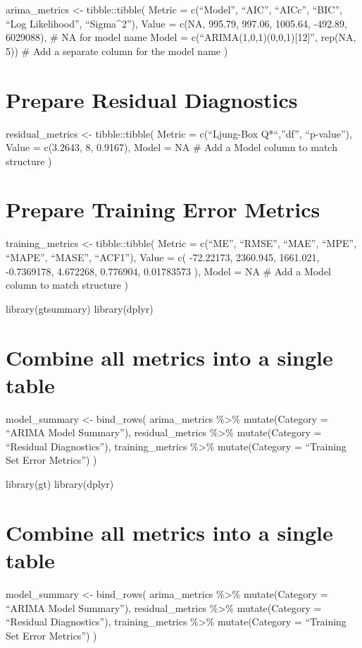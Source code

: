 \documentclass[
]{article}
\begin{document}
arima\_metrics \textless- tibble::tibble( Metric = c(``Model'', ``AIC'',
``AICc'', ``BIC'', ``Log Likelihood'', ``Sigma\^{}2''), Value = c(NA,
995.79, 997.06, 1005.64, -492.89, 6029088), \# NA for model name Model =
c(``ARIMA(1,0,1)(0,0,1){[}12{]}'', rep(NA, 5)) \# Add a separate column
for the model name )

\section{Prepare Residual
Diagnostics}\label{prepare-residual-diagnostics}

residual\_metrics \textless- tibble::tibble( Metric = c(``Ljung-Box
Q*``,''df'', ``p-value''), Value = c(3.2643, 8, 0.9167), Model = NA \#
Add a Model column to match structure )

\section{Prepare Training Error
Metrics}\label{prepare-training-error-metrics}

training\_metrics \textless- tibble::tibble( Metric = c(``ME'',
``RMSE'', ``MAE'', ``MPE'', ``MAPE'', ``MASE'', ``ACF1''), Value = c(
-72.22173, 2360.945, 1661.021, -0.7369178, 4.672268, 0.776904,
0.01783573 ), Model = NA \# Add a Model column to match structure )

library(gtsummary) library(dplyr)

\section{Combine all metrics into a single
table}\label{combine-all-metrics-into-a-single-table}

model\_summary \textless- bind\_rows( arima\_metrics \%\textgreater\%
mutate(Category = ``ARIMA Model Summary''), residual\_metrics
\%\textgreater\% mutate(Category = ``Residual Diagnostics''),
training\_metrics \%\textgreater\% mutate(Category = ``Training Set
Error Metrics'') )

library(gt) library(dplyr)

\section{Combine all metrics into a single
table}\label{combine-all-metrics-into-a-single-table-1}

model\_summary \textless- bind\_rows( arima\_metrics \%\textgreater\%
mutate(Category = ``ARIMA Model Summary''), residual\_metrics
\%\textgreater\% mutate(Category = ``Residual Diagnostics''),
training\_metrics \%\textgreater\% mutate(Category = ``Training Set
Error Metrics'') )
\end{document}
